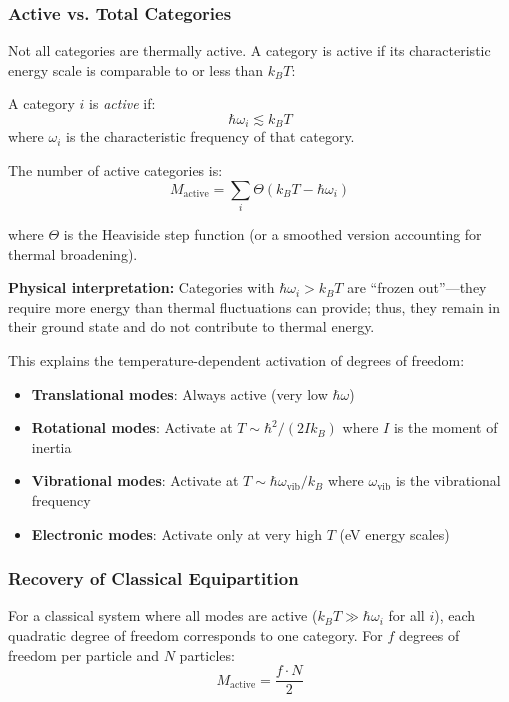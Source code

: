 \subsubsection{Active vs. Total Categories}

Not all categories are thermally active. A category is active if its characteristic energy scale is comparable to or less than $k_B T$:

\begin{definition}
A category $i$ is \textit{active} if:
\begin{equation}
\hbar\omega_i \lesssim k_B T
\end{equation}
where $\omega_i$ is the characteristic frequency of that category.
\end{definition}

The number of active categories is:
\begin{equation}
M_{\text{active}} = \sum_i \Theta(k_B T - \hbar\omega_i)
\end{equation}

where $\Theta$ is the Heaviside step function (or a smoothed version accounting for thermal broadening).

\textbf{Physical interpretation:} Categories with $\hbar\omega_i > k_B T$ are ``frozen out''---they require more energy than thermal fluctuations can provide; thus, they remain in their ground state and do not contribute to thermal energy.

This explains the temperature-dependent activation of degrees of freedom:
\begin{itemize}
\item \textbf{Translational modes}: Always active (very low $\hbar\omega$)
\item \textbf{Rotational modes}: Activate at $T \sim \hbar^2/(2Ik_B)$ where $I$ is the moment of inertia
\item \textbf{Vibrational modes}: Activate at $T \sim \hbar\omega_{\text{vib}}/k_B$ where $\omega_{\text{vib}}$ is the vibrational frequency
\item \textbf{Electronic modes}: Activate only at very high $T$ (eV energy scales)
\end{itemize}

\subsubsection{Recovery of Classical Equipartition}

For a classical system where all modes are active ($k_B T \gg \hbar\omega_i$ for all $i$), each quadratic degree of freedom corresponds to one category. For $f$ degrees of freedom per particle and $N$ particles:
\begin{equation}
M_{\text{active}} = \frac{f \cdot N}{2}
\end{equation}

